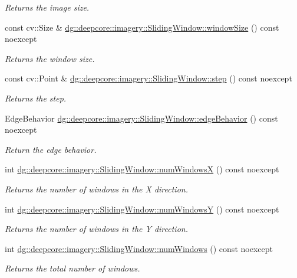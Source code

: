 \begin{DoxyCompactItemize}
\begin{DoxyCompactList}\small\item\em Returns the image size. \end{DoxyCompactList}\item 
const cv\+::\+Size \& \hyperlink{group___imagery_module_ga7d3254b7d65021c7f0464c2424479de1}{dg\+::deepcore\+::imagery\+::\+Sliding\+Window\+::window\+Size} () const noexcept
\begin{DoxyCompactList}\small\item\em Returns the window size. \end{DoxyCompactList}\item 
const cv\+::\+Point \& \hyperlink{group___imagery_module_gaa5f0a9213abf71efe1d51e6da9fc0163}{dg\+::deepcore\+::imagery\+::\+Sliding\+Window\+::step} () const noexcept
\begin{DoxyCompactList}\small\item\em Returns the step. \end{DoxyCompactList}\item 
Edge\+Behavior \hyperlink{group___imagery_module_ga069cd456276d030f571f59d1f04be74c}{dg\+::deepcore\+::imagery\+::\+Sliding\+Window\+::edge\+Behavior} () const noexcept
\begin{DoxyCompactList}\small\item\em Return the edge behavior. \end{DoxyCompactList}\item 
int \hyperlink{group___imagery_module_ga32af1d9b6602d69bd6e000c95b6c17d6}{dg\+::deepcore\+::imagery\+::\+Sliding\+Window\+::num\+WindowsX} () const noexcept
\begin{DoxyCompactList}\small\item\em Returns the number of windows in the X direction. \end{DoxyCompactList}\item 
int \hyperlink{group___imagery_module_gab7406512817ad61129d28a1315932fce}{dg\+::deepcore\+::imagery\+::\+Sliding\+Window\+::num\+WindowsY} () const noexcept
\begin{DoxyCompactList}\small\item\em Returns the number of windows in the Y direction. \end{DoxyCompactList}\item 
int \hyperlink{group___imagery_module_gadcf0dadb638b7a12ce4b43c1a769279c}{dg\+::deepcore\+::imagery\+::\+Sliding\+Window\+::num\+Windows} () const noexcept
\begin{DoxyCompactList}\small\item\em Returns the total number of windows. \end{DoxyCompactList}\item 

\end{DoxyCompactItemize}
